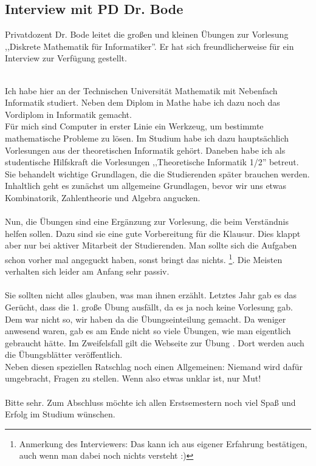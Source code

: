 \subsection{Interview mit PD Dr. Bode}

Privatdozent Dr. Bode leitet die großen und kleinen Übungen zur
Vorlesung ,,Diskrete Mathematik für Informatiker''. Er hat sich
freundlicherweise für ein Interview zur Verfügung gestellt.

 \\
Ich habe hier an der Technischen Universität Mathematik mit Nebenfach
Informatik studiert. Neben dem Diplom in Mathe habe ich dazu noch das
Vordiplom in Informatik gemacht.
\\
Für mich sind Computer in erster Linie ein Werkzeug, um bestimmte
mathematische Probleme zu lösen. Im Studium habe ich dazu
hauptsächlich Vorlesungen aus der theoretischen Informatik
gehört. Daneben habe ich als studentische Hilfskraft die Vorlesungen
,,Theoretische Informatik 1/2'' betreut.
\\
Sie behandelt wichtige Grundlagen, die die Studierenden später
brauchen werden. Inhaltlich geht es zunächst um allgemeine Grundlagen,
bevor wir uns etwas Kombinatorik, Zahlentheorie und Algebra angucken. \\
\\
Nun, die Übungen sind eine Ergänzung zur Vorlesung, die beim
Verständnis helfen sollen. Dazu sind sie eine gute Vorbereitung für
die Klausur. Dies klappt aber nur bei aktiver Mitarbeit der
Studierenden. Man sollte sich die Aufgaben schon vorher mal angeguckt
haben, sonst bringt das nichts. \footnote{Anmerkung des Interviewers:
Das kann ich aus eigener Erfahrung bestätigen, auch wenn man dabei
noch nichts versteht :)}. Die Meisten verhalten sich leider am Anfang
sehr passiv.\\
\\
Sie sollten  nicht alles glauben, was man ihnen
erzählt. Letztes Jahr gab es das Gerücht, dass die 1. große Übung
ausfällt, da es ja noch keine Vorlesung gab. Dem war nicht so, wir
haben da die Übungseinteilung gemacht. Da weniger anwesend waren, gab
es am Ende nicht so viele Übungen, wie man eigentlich gebraucht
hätte. Im Zweifelsfall gilt die Webseite zur Übung
. Dort werden auch die
Übungsblätter veröffentlich.\\
Neben diesen speziellen Ratschlag noch einen Allgemeinen: Niemand wird
dafür umgebracht, Fragen zu stellen. Wenn also etwas unklar ist, nur
Mut!\\
\\
Bitte sehr. Zum Abschluss möchte ich allen Erstsemestern noch viel
Spaß und Erfolg im Studium wünschen.
